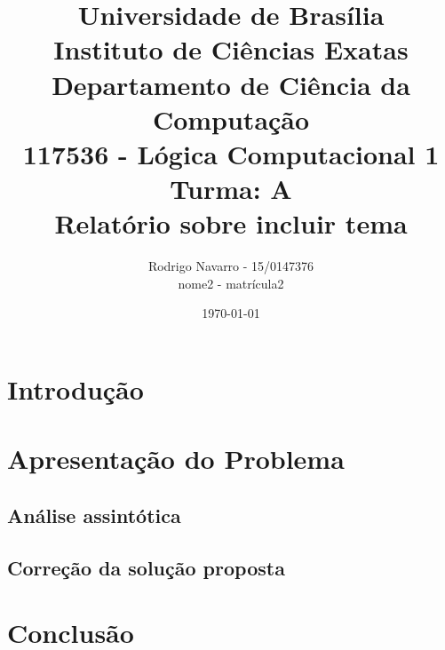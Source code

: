 \documentclass[12pt]{article}
\title{{\large Universidade de Brasília \\ Instituto de Ciências Exatas \\
Departamento de Ciência da Computação} \\[1cm]
117536 - Lógica Computacional 1 Turma: A\\[.5cm]
Relatório sobre {\bf incluir tema}}
\author{Rodrigo Navarro - 15/0147376 \\
        nome2 - matrícula2}
\date{\today}
\begin{document}
\maketitle

\section{Introdução}

\section{Apresentação do Problema}

\subsection{Análise assintótica}

\subsection{Correção da solução proposta}

\section{Conclusão}
\end{document}

